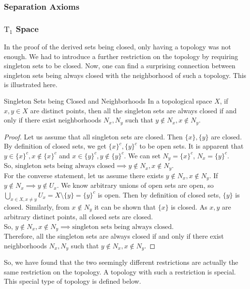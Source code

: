 \subsubsection{Separation Axioms}
\subsubsection{\texorpdfstring{$\mathrm{T}_1$}{T1} Space}
In the proof of the derived sets being closed, only having a topology was not enough. We had to introduce a further restriction on the topology by requiring singleton sets to be closed. Now, one can find a surprising connection between singleton sets being always closed with the neighborhood of such a topology. This is illustrated here.
\begin{Theorem}{Singleton Sets being Closed and Neighborhoods}\label{singleton_set_closed_disjoint_neighborhood}
    In a topological space $X$, if $x,y\in X$ are distinct points, then all the singleton sets are always closed if and only if there exist neighborhoods $N_x, N_y$ such that $y\notin N_x, x\notin N_y$.
\end{Theorem}
\begin{proof}
    Let us assume that all singleton sets are closed. Then $\{x\},\{y\}$ are closed. By definition of closed sets, we get $\{x\}^c,\{y\}^c$ to be open sets. It is apparent that $y\in\{x\}^c,x\notin\{x\}^c$ and $x\in\{y\}^c,y\notin\{y\}^c$. We can set $N_y=\{x\}^c$, $N_x=\{y\}^c$.\\ So, $\boxed{\text{singleton sets being always closed}\implies y\notin N_x,x\notin N_y}$.\\ For the converse statement, let us assume there exists $y\notin N_x,x\notin N_y$. If $y\notin N_x\implies y\notin U_x$. We know arbitrary unions of open sets are open, so $\bigcup_{x\in X,x\neq y}U_x=X\setminus\{y\}=\{y\}^c$ is open. Then by definition of closed sets, $\{y\}$ is closed. Similarly, from $x\notin N_y$ it can be shown that $\{x\}$ is closed. As $x, y$ are arbitrary distinct points, all closed sets are closed.\\
    So, $\boxed{y\notin N_x,x\notin N_y\implies\text{singleton sets being always closed}}$.\\
    Therefore, all the singleton sets are always closed if and only if there exist neighborhoods $N_x, N_y$ such that $y\notin N_x, x\notin N_y$.
\end{proof}
\noindent So, we have found that the two seemingly different restrictions are actually the same restriction on the topology. A topology with such a restriction is special. This special type of topology is defined below.
